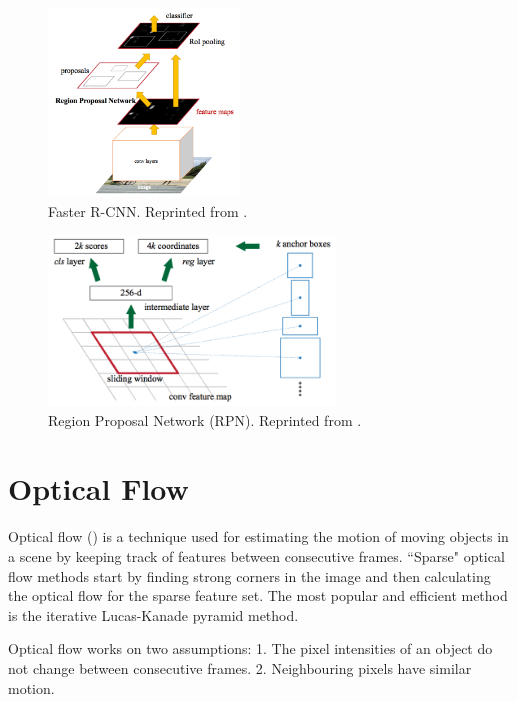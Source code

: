 \begin{figure}[t]
	\centering
	\includegraphics[width=2in]{figures/fasterrcnn.jpg}  
	\caption[Faster R-CNNs]{Faster R-CNN. Reprinted from . }
	\label{fig:fasterrcnn}
\end{figure}
\begin{figure}[t]
	\centering
	\includegraphics[width=3in]{figures/rpn.jpg}  
	\caption[RPN]{Region Proposal Network (RPN). Reprinted from . }
	\label{fig:rpn}
\end{figure}

\section{Optical Flow} 
\label{Optical Flow}
Optical flow () is a technique used for estimating the motion of moving objects in a scene by keeping track of features between consecutive frames. \textquotedblleft Sparse" optical flow methods start by finding strong corners in the image and then calculating the optical flow for the sparse feature set. The most popular and efficient method is the iterative Lucas-Kanade pyramid method.

Optical flow works on two assumptions:\newline
\tab \hspace{8mm}1. The pixel intensities of an object do not change between consecutive frames.\newline
\tab \hspace{8mm}2. Neighbouring pixels have similar motion.

